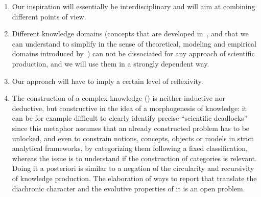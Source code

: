 \begin{enumerate}
	\item Our inspiration will essentially be interdisciplinary and will aim at combining different points of view.
	\item Different knowledge domains (concepts that are developed in~\cite{raimbault2017applied}, and that we can understand to simplify in the sense of theoretical, modeling and empirical domains introduced by~\cite{livet2010}) can not be dissociated for any approach of scientific production, and we will use them in a strongly dependent way.
	\item Our approach will have to imply a certain level of reflexivity.
	\item The construction of a complex knowledge (\cite{morin1991methode}) is neither inductive nor deductive, but constructive in the idea of a morphogenesis of knowledge: it can be for example difficult to clearly identify precise ``scientific deadlocks'' since this metaphor assumes that an already constructed problem has to be unlocked, and even to constrain notions, concepts, objects or models in strict analytical frameworks, by categorizing them following a fixed classification, whereas the issue is to understand if the construction of categories is relevant. Doing it a posteriori is similar to a negation of the circularity and recursivity of knowledge production. The elaboration of ways to report that translate the diachronic character and the evolutive properties of it is an open problem.
\end{enumerate}














